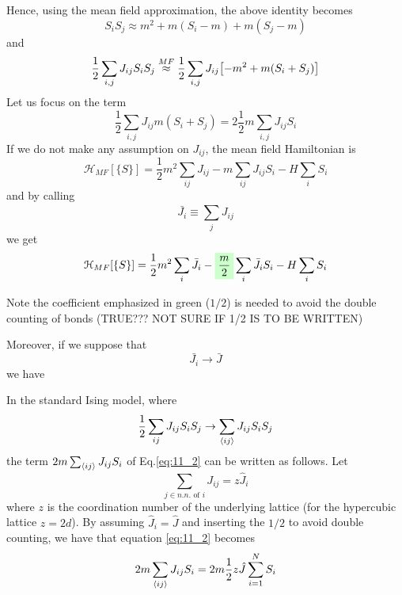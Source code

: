 \documentclass[../../Main/Main.tex]{subfiles}
\begin{document}
Hence, using the mean field approximation, the above identity becomes
\begin{equation*}
  S_i S_j  \approx m^2 + m(S_i-m) + m(S_j-m)
\end{equation*}
and
\begin{equation*}
  \frac{1}{2} \sum_{i,j}^{} J_{ij}S_i S_j \overset{MF}{\approx } \frac{1}{2} \sum_{i,j }^{} J_{ij} \qty[-m^2+m(S_i+S_j)]
\end{equation*}
Let us focus on the term
\begin{equation}
  \frac{1}{2} \sum_{i,j }^{} J_{ij} m (S_i+S_j) = 2 \frac{1}{2} m \sum_{i,j }^{} J_{ij}  S_i
  \label{eq:11_2}
\end{equation}
If we do not make any assumption on \( J_{ij} \), the mean field Hamiltonian is
\begin{equation}
\mathcal{H}_{MF} [ \{ S \}  ] = \frac{1}{2} m^2 \sum_{ij}^{} J_{ij} - m \sum_{ij}^{} J_{ij} S_i - H \sum_{i}^{} S_i
\end{equation}
and by calling
\begin{equation*}
  \bar{J_i} \equiv  \sum_{j}^{} J_{ij}
\end{equation*}
we get
\begin{equation*}
    \mathcal{H}_{MF} [ \{ S \}  ]  = \frac{1}{2} m^2 \sum_{i}^{} \bar{J_i} - \mathcolorbox{green!20}{\frac{m}{2}} \sum_{i}^{} \bar{J_i} S_i - H \sum_{i}^{} S_i
\end{equation*}
\begin{remark}
Note the coefficient emphasized in green (\( 1/2 \)) is needed to avoid the double counting of bonds (TRUE??? NOT SURE IF 1/2 IS TO BE WRITTEN)
\end{remark}
Moreover, if we suppose that
\begin{equation*}
  \bar{J_i} \rightarrow \bar{J}
\end{equation*}
we have
\begin{remark}
In the standard Ising model, where
\begin{equation*}
  \frac{1}{2} \sum_{ij}^{} J_{ij} S_i S_j \rightarrow \sum_{\expval{ij} }^{} J_{ij}    S_i S_j
\end{equation*}
the term \( 2 m \sum_{\expval{ij} }^{}  J_{ij} S_i \) of Eq.\eqref{eq:11_2} can be written as follows.
Let
\begin{equation*}
  \sum_{j \in n.n.\text{ of } i}^{} J_{ij} = z \hat{J}_i
\end{equation*}
where \( z \) is the coordination number of the underlying lattice (for the hypercubic lattice \( z=2d \)).
By assuming \( \hat{J}_i = \hat{J}  \) and inserting the \( 1/2 \) to avoid double counting, we have that equation \eqref{eq:11_2} becomes
\begin{equation}
  2m \sum_{\expval{ij} }^{}  J_{ij} S_i = 2 m \frac{1}{2} z \hat{J} \sum_{i=1}^{N} S_i
\end{equation}
\end{remark}
\end{document}
